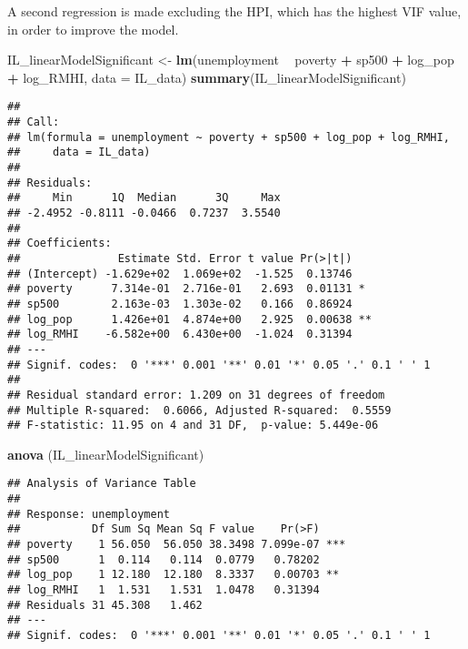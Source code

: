 \documentclass[
]{article}
\newenvironment{Shaded}{\begin{snugshade}}{\end{snugshade}}
\newcommand{\DataTypeTok}[1]{\textcolor[rgb]{0.13,0.29,0.53}{#1}}
\newcommand{\KeywordTok}[1]{\textcolor[rgb]{0.13,0.29,0.53}{\textbf{#1}}}
\newcommand{\NormalTok}[1]{#1}
\newcommand{\OperatorTok}[1]{\textcolor[rgb]{0.81,0.36,0.00}{\textbf{#1}}}
\newcommand{\StringTok}[1]{\textcolor[rgb]{0.31,0.60,0.02}{#1}}
\begin{document}
A second regression is made excluding the HPI, which has the highest VIF
value, in order to improve the model.

\begin{Shaded}
\begin{Highlighting}[]
\NormalTok{IL_linearModelSignificant <-}\StringTok{ }\KeywordTok{lm}\NormalTok{(unemployment }\OperatorTok{~}\StringTok{ }\NormalTok{poverty }\OperatorTok{+}\StringTok{ }\NormalTok{sp500 }\OperatorTok{+}\StringTok{ }\NormalTok{log_pop }\OperatorTok{+}\StringTok{ }\NormalTok{log_RMHI, }\DataTypeTok{data =}\NormalTok{ IL_data)}
\KeywordTok{summary}\NormalTok{(IL_linearModelSignificant)}
\end{Highlighting}
\end{Shaded}

\begin{verbatim}
## 
## Call:
## lm(formula = unemployment ~ poverty + sp500 + log_pop + log_RMHI, 
##     data = IL_data)
## 
## Residuals:
##     Min      1Q  Median      3Q     Max 
## -2.4952 -0.8111 -0.0466  0.7237  3.5540 
## 
## Coefficients:
##               Estimate Std. Error t value Pr(>|t|)   
## (Intercept) -1.629e+02  1.069e+02  -1.525  0.13746   
## poverty      7.314e-01  2.716e-01   2.693  0.01131 * 
## sp500        2.163e-03  1.303e-02   0.166  0.86924   
## log_pop      1.426e+01  4.874e+00   2.925  0.00638 **
## log_RMHI    -6.582e+00  6.430e+00  -1.024  0.31394   
## ---
## Signif. codes:  0 '***' 0.001 '**' 0.01 '*' 0.05 '.' 0.1 ' ' 1
## 
## Residual standard error: 1.209 on 31 degrees of freedom
## Multiple R-squared:  0.6066, Adjusted R-squared:  0.5559 
## F-statistic: 11.95 on 4 and 31 DF,  p-value: 5.449e-06
\end{verbatim}

\begin{Shaded}
\begin{Highlighting}[]
\KeywordTok{anova}\NormalTok{ (IL_linearModelSignificant)}
\end{Highlighting}
\end{Shaded}

\begin{verbatim}
## Analysis of Variance Table
## 
## Response: unemployment
##           Df Sum Sq Mean Sq F value    Pr(>F)    
## poverty    1 56.050  56.050 38.3498 7.099e-07 ***
## sp500      1  0.114   0.114  0.0779   0.78202    
## log_pop    1 12.180  12.180  8.3337   0.00703 ** 
## log_RMHI   1  1.531   1.531  1.0478   0.31394    
## Residuals 31 45.308   1.462                      
## ---
## Signif. codes:  0 '***' 0.001 '**' 0.01 '*' 0.05 '.' 0.1 ' ' 1
\end{verbatim}
\end{document}
